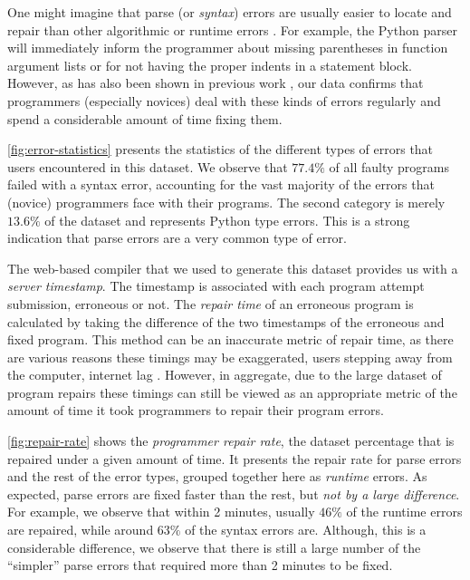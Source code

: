 One might imagine that parse (or \emph{syntax}) errors are
usually easier to locate and repair than other algorithmic
or runtime errors \citep{Denny_2012}.
%
For example, the Python parser will immediately inform the programmer
about missing parentheses in function argument lists or for not having
the proper indents in a statement block.
%
However, as has also been shown in previous
work \citep{Ahadi_2018, Kummerfeld2003}, our
data confirms that programmers (especially novices)
deal with these kinds of errors regularly and
spend a considerable amount of time fixing them.

%
\autoref{fig:error-statistics} presents the statistics
of the different types of errors that users encountered
in this dataset.
%
We observe that $77.4 \% $ of all faulty programs failed
with a syntax error, accounting for the vast majority of
the errors that (novice) programmers face with their
programs.
%
The second category is merely $13.6\%$ of the dataset and
represents Python type errors. This is a strong indication
that parse errors are a very common type of error.

%
The web-based compiler that we used to generate this
dataset provides us with a \emph{server timestamp}.
%
The timestamp is associated with each program attempt
submission, erroneous or not. The \emph{repair time}
of an erroneous program is calculated by taking the
difference of the two timestamps of the erroneous and
fixed program.
%
This method can be an inaccurate metric of repair time,
as there are various reasons these timings may be exaggerated,
\eg users stepping away from the computer, internet lag \etc.
%
However, in aggregate, due to the large
dataset of program repairs these timings
can still be viewed as an appropriate metric
of the amount of time it took programmers to
repair their program errors.

\autoref{fig:repair-rate} shows the \emph{programmer repair rate},
\ie the dataset percentage that is repaired under a given amount of time.
%
It presents the repair rate for parse errors and the rest
of the error types, grouped together here as \emph{runtime} errors.
%
As expected, parse errors are fixed faster than the rest,
but \emph{not by a large difference}.
%
For example, we observe that within 2 minutes,
usually $46\%$ of the runtime errors are repaired, while
around $63\%$ of the syntax errors are.
%
Although, this is a considerable difference,
we observe that there is still a large number
of the ``simpler'' parse errors that required
more than 2 minutes to be fixed.


